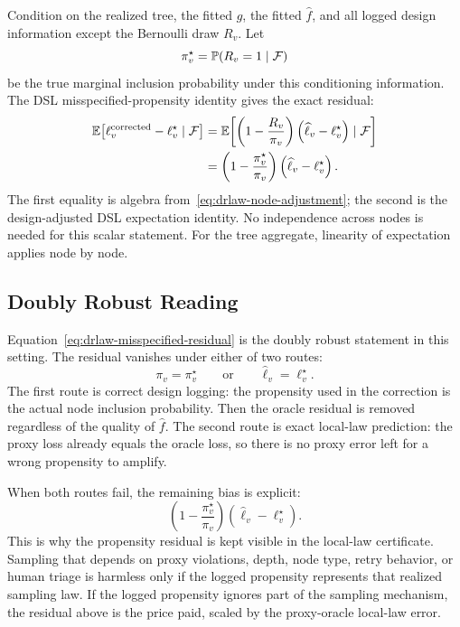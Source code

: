 Condition on the realized tree, the fitted \(g\), the fitted
\(\widehat f\), and all logged design information except the Bernoulli
draw \(R_v\). Let
\[
  \pi_v^\star
  =
  \mathbb{P}(R_v=1\mid \mathcal F)
\]
be the true marginal inclusion probability under this conditioning
information. The DSL misspecified-propensity identity gives the exact
residual:
\begin{align}
  \mathbb{E}\!\left[
    \ell_v^{\mathrm{corrected}}-\ell_v^\star
    \mid \mathcal F
  \right]
  &=
  \mathbb{E}\!\left[
    \left(1-\frac{R_v}{\pi_v}\right)
    \left(\widehat\ell_v-\ell_v^\star\right)
    \mid \mathcal F
  \right] \notag\\
  &=
  \left(1-\frac{\pi_v^\star}{\pi_v}\right)
  \left(\widehat\ell_v-\ell_v^\star\right).
\label{eq:drlaw-misspecified-residual}
\end{align}
The first equality is algebra from~\eqref{eq:drlaw-node-adjustment};
the second is the design-adjusted DSL expectation identity. No
independence across nodes is needed for this scalar statement. For the
tree aggregate, linearity of expectation applies node by node.

\subsection{Doubly Robust Reading}
\label{app:drlaw-doubly-robust}

Equation~\eqref{eq:drlaw-misspecified-residual} is the doubly robust
statement in this setting. The residual vanishes under either of two
routes:
\[
  \pi_v=\pi_v^\star
  \qquad\text{or}\qquad
  \widehat\ell_v=\ell_v^\star .
\]
The first route is correct design logging: the propensity used in the
correction is the actual node inclusion probability. Then the oracle
residual is removed regardless of the quality of \(\widehat f\). The
second route is exact local-law prediction: the proxy loss already
equals the oracle loss, so there is no proxy error left for a wrong
propensity to amplify.

When both routes fail, the remaining bias is explicit:
\[
  \left(1-\frac{\pi_v^\star}{\pi_v}\right)
  \left(\widehat\ell_v-\ell_v^\star\right).
\]
This is why the propensity residual is kept visible in the local-law
certificate. Sampling that depends on proxy violations, depth, node
type, retry behavior, or human triage is harmless only if the logged
propensity represents that realized sampling law. If the logged
propensity ignores part of the sampling mechanism, the residual above
is the price paid, scaled by the proxy-oracle local-law error.

